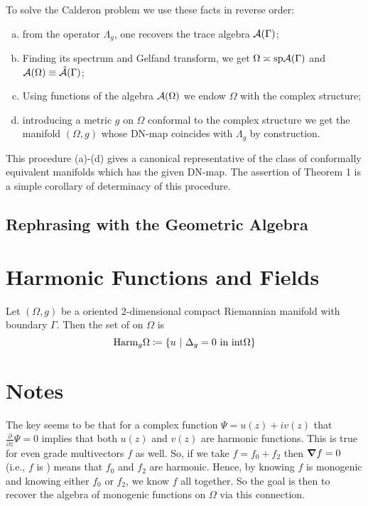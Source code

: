 To solve the Calderon problem we use these facts in reverse order:
\begin{enumerate}[(a)]
	\item from the operator $\Lambda_g$, one recovers the trace algebra $\mathcal{A}(\Gamma)$;
	\item Finding its spectrum and Gelfand transform, we get $\Omega \asymp \mathrm{sp} \mathcal{A}(\Gamma)$ and $\mathcal{A}(\Omega)\equiv \hat{\mathcal{A}}(\Gamma)$;
	\item Using functions of the algebra $\mathcal{A}(\Omega)$ we endow $\Omega$ with the complex structure;
	\item introducing a metric $g$ on $\Omega$ conformal to the complex structure we get the manifold $(\Omega,g)$ whose DN-map coincides with $\Lambda_g$ by construction.
\end{enumerate}
This procedure (a)-(d) gives a canonical representative of the class of conformally equivalent manifolds which has the given DN-map. The assertion of Theorem 1 is a simple corollary of determinacy of this procedure.

\subsection{Rephrasing with the Geometric Algebra}

\section{Harmonic Functions and Fields}

Let $(\Omega,g)$ be a oriented 2-dimensional compact Riemannian manifold with boundary $\Gamma$. Then the set of  on $\Omega$ is
  \[
  \mathrm{Harm}_g \Omega \coloneqq \{u~\vert~\Delta_g=0 ~\textrm{in}~\mathrm{int} \Omega\}
  \]

\section{Notes}
The key seems to be that for a complex function $\Psi=u(z)+iv(z)$ that $\frac{\partial}{\partial z} \Psi =0$ implies that both $u(z)$ and $v(z)$ are harmonic functions. This is true for even grade multivectors $f$ as well. So, if we take $f=f_0+f_2$ then $\boldsymbol{\nabla} f =0$ (i.e., $f$ is ) means that $f_0$ and $f_2$ are harmonic.  Hence, by knowing $f$ is monogenic and knowing either $f_0$ or $f_2$, we know $f$ all together.  So the goal is then to recover the algebra of monogenic functions on $\Omega$ via this connection.

